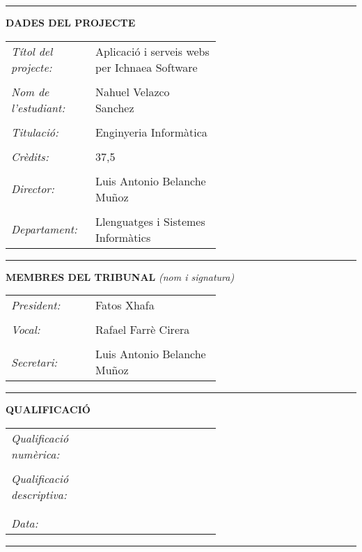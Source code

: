 \hrule

\medskip

\textbf{\uppercase{Dades del projecte}} \\

\bigskip

\begin{tabular}{lp{0.6\linewidth}}
\emph{T\'{i}tol del projecte:} & Aplicaci\'{o} i serveis webs per Ichnaea Software \\
\\
\emph{Nom de l'estudiant:} & Nahuel Velazco Sanchez \\
\\
\emph{Titulaci\'{o}:} & Enginyeria Inform\`{a}tica \\
\\
\emph{Cr\`{e}dits:} & 37,5 \\
\\
\emph{Director:} & Luis Antonio Belanche Muñoz\\
\\
\emph{Departament:} & Llenguatges i Sistemes Inform\`{a}tics \\
\end{tabular}

\bigskip

\bigskip

\hrule

\medskip

\textbf{\uppercase{Membres del tribunal}} \emph{(nom i signatura)} \\

\bigskip

\begin{tabular}{lp{0.6\linewidth}}
\emph{President:} & Fatos Xhafa \\
\\
\emph{Vocal:} & Rafael Farr\`{e} Cirera \\
\\
\emph{Secretari:} &  Luis Antonio Belanche Muñoz\\
\end{tabular}

\bigskip

\bigskip

\hrule

\medskip

\textbf{\uppercase{Qualificaci\'{o}}} \\

\bigskip

\begin{tabular}{lp{0.6\linewidth}}
\emph{Qualificaci\'{o} num\`{e}rica:} & \\
\\
\emph{Qualificaci\'{o} descriptiva:} & \\
\\
\\
\emph{Data:} & \\
\end{tabular}

\bigskip

\hrule

\pagebreak

